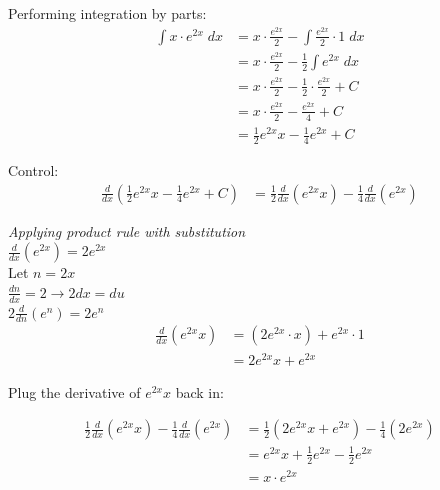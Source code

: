 \documentclass[a4paper]{article}
\begin{document}
\begin{enumerate}
\begin{enumerate}
\begin{center}
\end{center}
\newpage

Performing integration by parts:\\

\begin{align*}
	\int x \cdot e^{2x} \; dx &=  x \cdot \frac{e^{2x}}{2} - \int \frac{e^{2x}}{2} \cdot 1 \; dx\\
	&= x \cdot \frac{e^{2x}}{2} - \frac{1}{2} \int e^{2x} \; dx\\
	&= x \cdot \frac{e^{2x}}{2} - \frac{1}{2} \cdot \frac{e^{2x}}{2} + C\\
	&= x \cdot \frac{e^{2x}}{2} - \frac{e^{2x}}{4} + C\\
	&= \frac{1}{2} e^{2x}x - \frac{1}{4}e^{2x} + C
\end{align*}
	
	
Control:\\

\begin{align*}
	\frac{d}{dx}(\frac{1}{2}e^{2x}x - \frac{1}{4}e^{2x} + C) &= \frac{1}{2}\frac{d}{dx}(e^{2x}x) - \frac{1}{4}\frac{d}{dx}(e^{2x})
\end{align*}	

\textit{Applying product rule with substitution}\\

$\frac{d}{dx}(e^{2x}) = 2 e^{2x}$\\

Let $n = 2x$\\
$\frac{dn}{dx} = 2 \rightarrow 2dx = du$\\

$2 \frac{d}{dn}(e^n) = 2 e^n$\\


\begin{align*}
\frac{d}{dx}(e^{2x}x) &= (2e^{2x} \cdot x) + e^{2x} \cdot 1\\
&= 2e^{2x}x + e^{2x}
\end{align*}

Plug the derivative of $e^{2x}x$ back in:

\begin{align*}
	\frac{1}{2}\frac{d}{dx}(e^{2x}x) - \frac{1}{4}\frac{d}{dx}(e^{2x}) &= \frac{1}{2}(2e^{2x}x + e^{2x}) - \frac{1}{4}(2e^{2x})\\
	&= e^{2x}x + \frac{1}{2}e^{2x} - \frac{1}{2}e^{2x}\\
	&= x \cdot e^{2x}
\end{align*}

\newpage
	

\end{enumerate}
\end{enumerate}
\end{document}
